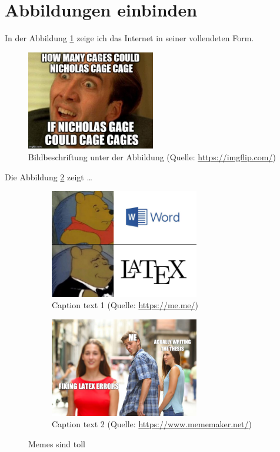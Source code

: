 \section{Abbildungen einbinden}\label{sec:abbildungen}
In der Abbildung \ref{fig:nico} zeige ich das Internet in seiner vollendeten Form.
\begin{figure}
    \includegraphics[width=0.5\textwidth,angle=0]{abb/26z3fo.jpg}
    \caption[Bildbeschriftung für Abbildungsverzeichnis]{Bildbeschriftung unter der Abbildung (Quelle: \url{https://imgflip.com/})}
    \label{fig:nico}
\end{figure}
\blindtext[1]

Die Abbildung \ref{fig:latex} zeigt \dots
\begin{figure}[hb]
    \begin{subfigure}{6cm}
      \centering
      \includegraphics[width=6.5cm]{abb/1zfte27tn3q21.jpg}
      \caption{Caption text 1 (Quelle: \url{https://me.me/})}
    \end{subfigure}
    \begin{subfigure}{6cm}
      \centering
      \includegraphics[width=6.5cm]{abb/bucket.png}
      \caption{Caption text 2 (Quelle: \url{https://www.mememaker.net/})}
    \end{subfigure}
    \caption[Memes sind toll]{Memes sind toll}
    \label{fig:latex}
\end{figure}